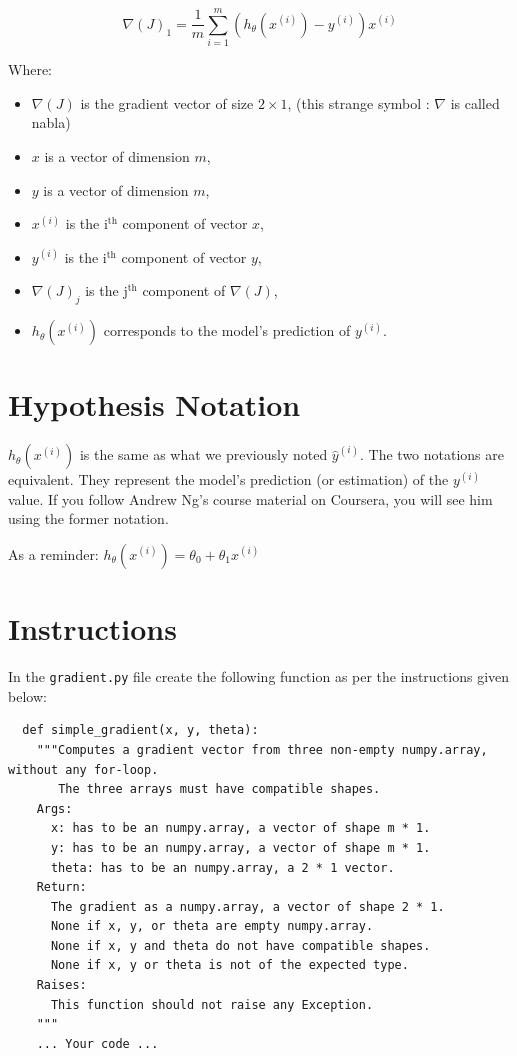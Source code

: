 \documentclass{42-en}
\begin{document}
$$
\nabla(J)_1 = \frac{1}{m}\sum_{i=1}^{m}(h_{\theta}(x^{(i)}) - y^{(i)})x^{(i)}
$$

Where:
\begin{itemize}
  \item $\nabla(J)$ is the gradient vector of size $2 \times 1$, (this strange symbol : $\nabla$ is called nabla)
  \item $x$ is a vector of dimension $m$,
  \item $y$ is a vector of dimension $m$,
  \item $x^{(i)}$ is the i$^\text{th}$ component of vector $x$,
  \item $y^{(i)}$ is the i$^\text{th}$ component of vector $y$,
  \item $\nabla(J)_j$ is the j$^\text{th}$ component of $\nabla(J)$,
  \item $h_{\theta}(x^{(i)})$ corresponds to the model's prediction of $y^{(i)}$.
\end{itemize}

\section*{Hypothesis Notation}
$h_{\theta}(x^{(i)})$ is the same as what we previously noted $\hat{y}^{(i)}$.  
The two notations are equivalent.
They represent the model's prediction (or estimation) of the ${y}^{(i)}$ value.
If you follow Andrew Ng's course material on Coursera, you will see him using the former notation.

As a reminder:
$h_{\theta}(x^{(i)}) = \theta_0 + \theta_1x^{(i)}$


\section*{Instructions}

In the \texttt{gradient.py} file create the following function as per the instructions given below:

\begin{verbatim}
  def simple_gradient(x, y, theta):
    """Computes a gradient vector from three non-empty numpy.array, without any for-loop.
       The three arrays must have compatible shapes.
    Args:
      x: has to be an numpy.array, a vector of shape m * 1.
      y: has to be an numpy.array, a vector of shape m * 1.
      theta: has to be an numpy.array, a 2 * 1 vector.
    Return:
      The gradient as a numpy.array, a vector of shape 2 * 1.
      None if x, y, or theta are empty numpy.array.
      None if x, y and theta do not have compatible shapes.
      None if x, y or theta is not of the expected type.
    Raises:
      This function should not raise any Exception.
    """
    ... Your code ...
\end{verbatim}
\end{document}
